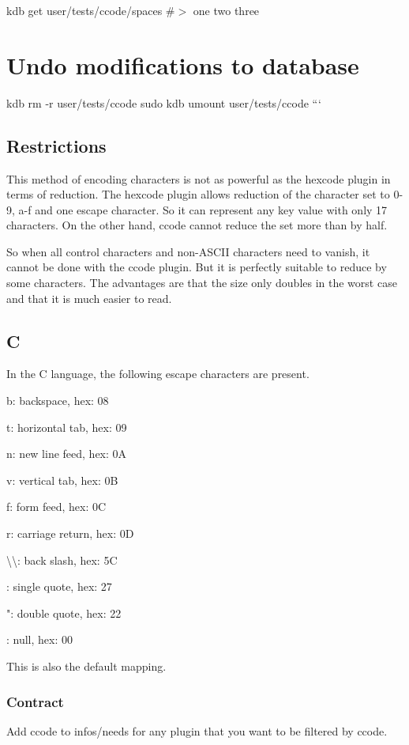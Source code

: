 kdb get user/tests/ccode/spaces \#$>$ one two three

\section*{Undo modifications to database}

kdb rm -\/r user/tests/ccode sudo kdb umount user/tests/ccode ```

\subsection*{Restrictions}

This method of encoding characters is not as powerful as the hexcode plugin in terms of reduction. The hexcode plugin allows reduction of the character set to \textquotesingle{}0\textquotesingle{}-\/\textquotesingle{}9\textquotesingle{}, \textquotesingle{}a\textquotesingle{}-\/\textquotesingle{}f\textquotesingle{} and one escape character. So it can represent any key value with only 17 characters. On the other hand, ccode cannot reduce the set more than by half.

So when all control characters and non-\/\+A\+S\+C\+II characters need to vanish, it cannot be done with the ccode plugin. But it is perfectly suitable to reduce by some characters. The advantages are that the size only doubles in the worst case and that it is much easier to read.

\subsection*{C}

In the C language, the following escape characters are present.


\begin{DoxyItemize}
\item {\ttfamily b}\+: backspace, hex\+: 08
\item {\ttfamily t}\+: horizontal tab, hex\+: 09
\item {\ttfamily n}\+: new line feed, hex\+: 0A
\item {\ttfamily v}\+: vertical tab, hex\+: 0B
\item {\ttfamily f}\+: form feed, hex\+: 0C
\item {\ttfamily r}\+: carriage return, hex\+: 0D
\item {\ttfamily \textbackslash{}\textbackslash{}}\+: back slash, hex\+: 5C
\item {\ttfamily \textquotesingle{}}\+: single quote, hex\+: 27
\item {\ttfamily "}\+: double quote, hex\+: 22
\item {}\+: null, hex\+: 00
\end{DoxyItemize}

This is also the default mapping.

\subsubsection*{Contract}

Add {\ttfamily ccode} to {\ttfamily infos/needs} for any plugin that you want to be filtered by ccode. 